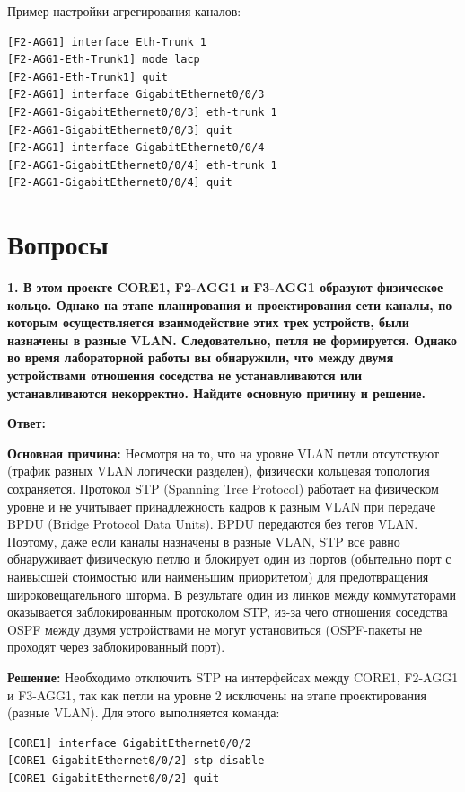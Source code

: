 Пример настройки агрегирования каналов:

\begin{verbatim}
[F2-AGG1] interface Eth-Trunk 1
[F2-AGG1-Eth-Trunk1] mode lacp
[F2-AGG1-Eth-Trunk1] quit
[F2-AGG1] interface GigabitEthernet0/0/3
[F2-AGG1-GigabitEthernet0/0/3] eth-trunk 1
[F2-AGG1-GigabitEthernet0/0/3] quit
[F2-AGG1] interface GigabitEthernet0/0/4
[F2-AGG1-GigabitEthernet0/0/4] eth-trunk 1
[F2-AGG1-GigabitEthernet0/0/4] quit
\end{verbatim}

\section{Вопросы}

\textbf{1. В этом проекте CORE1, F2-AGG1 и F3-AGG1 образуют физическое кольцо. Однако на этапе планирования и проектирования сети каналы, по которым осуществляется взаимодействие этих трех устройств, были назначены в разные VLAN. Следовательно, петля не формируется. Однако во время лабораторной работы вы обнаружили, что между двумя устройствами отношения соседства не устанавливаются или устанавливаются некорректно. Найдите основную причину и решение.}

\textbf{Ответ:}

\textbf{Основная причина:} Несмотря на то, что на уровне VLAN петли отсутствуют (трафик разных VLAN логически разделен), физически кольцевая топология сохраняется. Протокол STP (Spanning Tree Protocol) работает на физическом уровне и не учитывает принадлежность кадров к разным VLAN при передаче BPDU (Bridge Protocol Data Units). BPDU передаются без тегов VLAN. Поэтому, даже если каналы назначены в разные VLAN, STP все равно обнаруживает физическую петлю и блокирует один из портов (обытельно порт с наивысшей стоимостью или наименьшим приоритетом) для предотвращения широковещательного шторма. В результате один из линков между коммутаторами оказывается заблокированным протоколом STP, из-за чего отношения соседства OSPF между двумя устройствами не могут установиться (OSPF-пакеты не проходят через заблокированный порт).

\textbf{Решение:} Необходимо отключить STP на интерфейсах между CORE1, F2-AGG1 и F3-AGG1, так как петли на уровне 2 исключены на этапе проектирования (разные VLAN). Для этого выполняется команда:

\begin{verbatim}
[CORE1] interface GigabitEthernet0/0/2
[CORE1-GigabitEthernet0/0/2] stp disable
[CORE1-GigabitEthernet0/0/2] quit
\end{verbatim}

